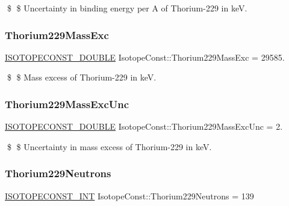 \$ \$ Uncertainty in binding energy per A of Thorium-\/229 in keV. \mbox{\label{group___isotope_const-_thorium-_th229_ga4c36ef6f3262d89bb7a00f3062a3c000}} 
\subsubsection{\texorpdfstring{Thorium229\+Mass\+Exc}{Thorium229MassExc}}
{\footnotesize\ttfamily \mbox{\hyperlink{group___isotope_const-_macros_ga8f45a7272ce02c0b4c65c44636ed719a}{I\+S\+O\+T\+O\+P\+E\+C\+O\+N\+S\+T\+\_\+\+D\+O\+U\+B\+LE}} Isotope\+Const\+::\+Thorium229\+Mass\+Exc = 29585.}

\$ \$ Mass excess of Thorium-\/229 in keV. \mbox{\label{group___isotope_const-_thorium-_th229_ga354fbb825054f78143db9fe484f39a56}} 
\subsubsection{\texorpdfstring{Thorium229\+Mass\+Exc\+Unc}{Thorium229MassExcUnc}}
{\footnotesize\ttfamily \mbox{\hyperlink{group___isotope_const-_macros_ga8f45a7272ce02c0b4c65c44636ed719a}{I\+S\+O\+T\+O\+P\+E\+C\+O\+N\+S\+T\+\_\+\+D\+O\+U\+B\+LE}} Isotope\+Const\+::\+Thorium229\+Mass\+Exc\+Unc = 2.}

\$ \$ Uncertainty in mass excess of Thorium-\/229 in keV. \mbox{\label{group___isotope_const-_thorium-_th229_ga28608a72c86e6ce0e16561b280726914}} 
\subsubsection{\texorpdfstring{Thorium229\+Neutrons}{Thorium229Neutrons}}
{\footnotesize\ttfamily \mbox{\hyperlink{group___isotope_const-_macros_ga5f18360b3e99483a35c32d789e62621c}{I\+S\+O\+T\+O\+P\+E\+C\+O\+N\+S\+T\+\_\+\+I\+NT}} Isotope\+Const\+::\+Thorium229\+Neutrons = 139}

